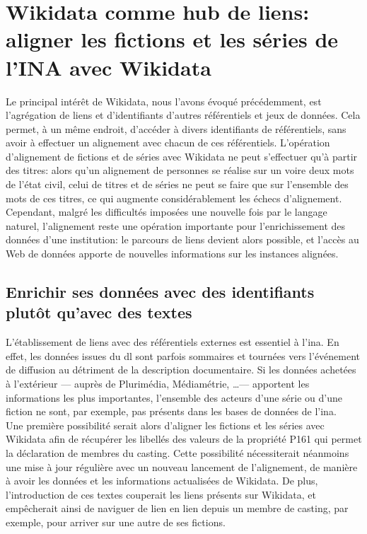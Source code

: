 \section[Wikidata comme hub de liens]{\label{III-A-3}Wikidata comme hub de liens: aligner les fictions et les séries de l'INA avec Wikidata}

Le principal intérêt de Wikidata, nous l'avons évoqué précédemment, est l'agrégation de liens et d'identifiants d'autres référentiels et jeux de données. Cela permet, à un même endroit, d'accéder à divers identifiants de référentiels, sans avoir à effectuer un alignement avec chacun de ces référentiels. L'opération d'alignement de fictions et de séries avec Wikidata ne peut s'effectuer qu'à partir des titres: alors qu'un alignement de personnes se réalise sur un voire deux mots de l'état civil, celui de titres et de séries ne peut se faire que sur l'ensemble des mots de ces titres, ce qui augmente considérablement les échecs d'alignement.\\

Cependant, malgré les difficultés imposées une nouvelle fois par le langage naturel, l'alignement reste une opération importante pour l'enrichissement des données d'une institution: le parcours de liens devient alors possible, et l'accès au Web de données apporte de nouvelles informations sur les instances alignées.

\subsection{\label{III-A-3-a}Enrichir ses données avec des identifiants plutôt qu'avec des textes}

L'établissement de liens avec des référentiels externes est essentiel à l'\ac{ina}. En effet, les données issues du \ac{dl} sont parfois sommaires et tournées vers l'événement de diffusion au détriment de la description documentaire. Si les données achetées à l'extérieur --- auprès de Plurimédia, Médiamétrie, \dots --- apportent les informations les plus importantes, l'ensemble des acteurs d'une série ou d'une fiction ne sont, par exemple, pas présents dans les bases de données de l'\ac{ina}.\\

Une première possibilité serait alors d'aligner les fictions et les séries avec Wikidata afin de récupérer les libellés des valeurs de la propriété P161 qui permet la déclaration de membres du casting. Cette possibilité nécessiterait néanmoins une mise à jour régulière avec un nouveau lancement de l'alignement, de manière à avoir les données et les informations actualisées de Wikidata. De plus, l'introduction de ces textes couperait les liens présents sur Wikidata, et empêcherait ainsi de naviguer de lien en lien depuis un membre de casting, par exemple, pour arriver sur une autre de ses fictions.\\

